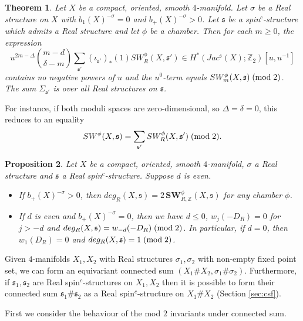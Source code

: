 \documentclass{amsart}
\newtheorem{theorem}{Theorem}[section]
\newtheorem{proposition}[theorem]{Proposition}
\theoremstyle{definition}
\theoremstyle{remark}
\numberwithin{equation}{section}
\begin{document}
\begin{theorem}
Let $X$ be a compact, oriented, smooth $4$-manifold. Let $\sigma$ be a Real structure on $X$ with $b_1(X)^{-\sigma} = 0$ and $b_+(X)^{-\sigma} > 0$. Let $\mathfrak{s}$ be a spin$^c$-structure which admits a Real structure and let $\phi$ be a chamber. Then for each $m \ge 0$, the expression
\[
u^{2m-\Delta} \binom{m-d}{\delta-m} \sum_{\mathfrak{s}'} (\iota_{\mathfrak{s}'})_*(1) SW^\phi_R(X, \mathfrak{s}') \in H^*( Jac^{\mathfrak{s}}(X) ; \mathbb{Z}_2)[u,u^{-1}]
\]
contains no negative powers of $u$ and the $u^0$-term equals $SW^\phi_m(X,\mathfrak{s}) \; ({\rm mod} \; 2)$. The sum $\Sigma_{\mathfrak{s}'}$ is over all Real structures on $\mathfrak{s}$.
\end{theorem}

For instance, if both moduli spaces are zero-dimensional, so $\Delta = \delta = 0$, this reduces to an equality
\[
SW^\phi(X , \mathfrak{s}) = \sum_{\mathfrak{s}'} SW^\phi_R(X , \mathfrak{s}') \; ({\rm mod} \; 2).
\]



\begin{proposition}
Let $X$ be a compact, oriented, smooth $4$-manifold, $\sigma$ a Real structure and $\mathfrak{s}$ a Real spin$^c$-structure. Suppose $d$ is even.
\begin{itemize}
\item[(1)]{If $b_+(X)^{-\sigma}>0$, then $deg_R(X,\mathfrak{s}) = 2 \, \mathbf{SW}^\phi_{R,\mathbb{Z}}(X , \mathfrak{s})$ for any chamber $\phi$.}
\item[(2)]{If $d$ is even and $b_+(X)^{-\sigma} = 0$, then we have $d \le 0$, $w_j(-D_R) = 0$ for $j > -d$ and $deg_R(X,\mathfrak{s}) = w_{-d}(-D_R) \; ({\rm mod} \; 2)$. In particular, if $d=0$, then $w_1(D_R) = 0$ and $deg_R(X , \mathfrak{s}) = 1 \; ({\rm mod} \; 2)$.}
\end{itemize}
\end{proposition}


 Given $4$-manifolds $X_1,X_2$ with Real structures $\sigma_1,\sigma_2$ with non-empty fixed point set, we can form an equivariant connected sum $(X_1 \# X_2 , \sigma_1 \# \sigma_2)$. Furthermore, if $\mathfrak{s}_1,\mathfrak{s}_2$ are Real spin$^c$-structures on $X_1,X_2$ then it is possible to form their connected sum $\mathfrak{s}_1 \# \mathfrak{s}_2$ as a Real spin$^c$-structure on $X_1 \# X_2$ (Section \ref{sec:csf}).

First we consider the behaviour of the mod $2$ invariants under connected sum.
\end{document}
